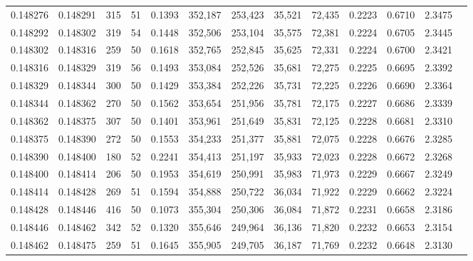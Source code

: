 \begin{tabular}{rrrrrrrrrrrrr}
0.148276 & 0.148291 &   315 &  51 &                                     0.1393 & 352,187 & 253,423 &  35,521 &  72,435 & 0.2223 & 0.6710 & 2.3475 \\
0.148292 & 0.148302 &   319 &  54 &                                     0.1448 & 352,506 & 253,104 &  35,575 &  72,381 & 0.2224 & 0.6705 & 2.3445 \\
0.148302 & 0.148316 &   259 &  50 &                                     0.1618 & 352,765 & 252,845 &  35,625 &  72,331 & 0.2224 & 0.6700 & 2.3421 \\
0.148316 & 0.148329 &   319 &  56 &                                     0.1493 & 353,084 & 252,526 &  35,681 &  72,275 & 0.2225 & 0.6695 & 2.3392 \\
0.148329 & 0.148344 &   300 &  50 &                                     0.1429 & 353,384 & 252,226 &  35,731 &  72,225 & 0.2226 & 0.6690 & 2.3364 \\
0.148344 & 0.148362 &   270 &  50 &                                     0.1562 & 353,654 & 251,956 &  35,781 &  72,175 & 0.2227 & 0.6686 & 2.3339 \\
0.148362 & 0.148375 &   307 &  50 &                                     0.1401 & 353,961 & 251,649 &  35,831 &  72,125 & 0.2228 & 0.6681 & 2.3310 \\
0.148375 & 0.148390 &   272 &  50 &                                     0.1553 & 354,233 & 251,377 &  35,881 &  72,075 & 0.2228 & 0.6676 & 2.3285 \\
0.148390 & 0.148400 &   180 &  52 &                                     0.2241 & 354,413 & 251,197 &  35,933 &  72,023 & 0.2228 & 0.6672 & 2.3268 \\
0.148400 & 0.148414 &   206 &  50 &                                     0.1953 & 354,619 & 250,991 &  35,983 &  71,973 & 0.2229 & 0.6667 & 2.3249 \\
0.148414 & 0.148428 &   269 &  51 &                                     0.1594 & 354,888 & 250,722 &  36,034 &  71,922 & 0.2229 & 0.6662 & 2.3224 \\
0.148428 & 0.148446 &   416 &  50 &                                     0.1073 & 355,304 & 250,306 &  36,084 &  71,872 & 0.2231 & 0.6658 & 2.3186 \\
0.148446 & 0.148462 &   342 &  52 &                                     0.1320 & 355,646 & 249,964 &  36,136 &  71,820 & 0.2232 & 0.6653 & 2.3154 \\
0.148462 & 0.148475 &   259 &  51 &                                     0.1645 & 355,905 & 249,705 &  36,187 &  71,769 & 0.2232 & 0.6648 & 2.3130 \\

\end{tabular}
